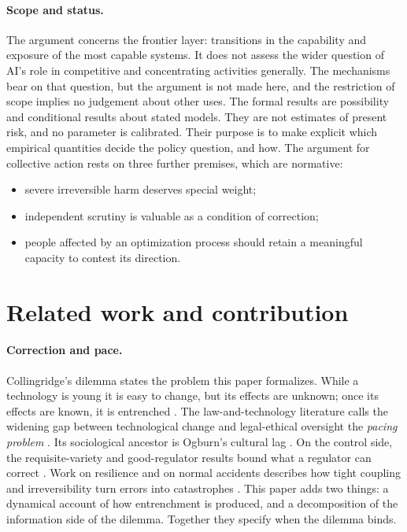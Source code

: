\documentclass[11pt]{article}
\theoremstyle{plain}
\theoremstyle{definition}
\begin{document}
\paragraph{Scope and status.} The argument concerns the frontier layer: transitions in the capability and exposure of the most capable systems. It does not assess the wider question of AI's role in competitive and concentrating activities generally. The mechanisms bear on that question, but the argument is not made here, and the restriction of scope implies no judgement about other uses. The formal results are possibility and conditional results about stated models. They are not estimates of present risk, and no parameter is calibrated. Their purpose is to make explicit which empirical quantities decide the policy question, and how. The argument for collective action rests on three further premises, which are normative:
\begin{itemize}[leftmargin=*]
\item severe irreversible harm deserves special weight;
\item independent scrutiny is valuable as a condition of correction;
\item people affected by an optimization process should retain a meaningful capacity to contest its direction.
\end{itemize}

\section{Related work and contribution}\label{sec:related}

\paragraph{Correction and pace.} Collingridge's dilemma states the problem this paper formalizes. While a technology is young it is easy to change, but its effects are unknown; once its effects are known, it is entrenched \citep{collingridge1980}. The law-and-technology literature calls the widening gap between technological change and legal-ethical oversight the \emph{pacing problem} \citep{marchant2011}. Its sociological ancestor is Ogburn's cultural lag \citep{ogburn1922}. On the control side, the requisite-variety and good-regulator results bound what a regulator can correct \citep{ashby1956,conant1970}. Work on resilience and on normal accidents describes how tight coupling and irreversibility turn errors into catastrophes \citep{holling1973,perrow1984}. This paper adds two things: a dynamical account of how entrenchment is produced, and a decomposition of the information side of the dilemma. Together they specify when the dilemma binds.
\end{document}
